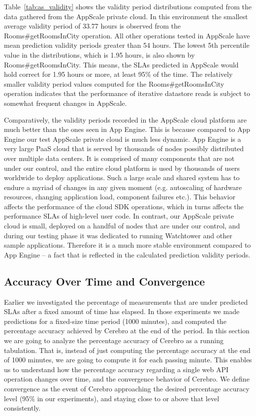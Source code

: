 Table~\ref{tab:as_validity} shows the validity period distributions computed from the data gathered from
the AppScale private cloud. In this environment the smallest average validity period of 33.77 hours is observed from the
Rooms\#getRoomsInCity operation. All other operations tested in AppScale have mean prediction validity periods greater
than 54 hours. The lowest 5th percentile value in the distributions, which is 1.95 hours, is also shown by Rooms\#getRoomsInCity. This means, the SLAs predicted in AppScale would hold correct for 1.95 hours or more, at least 95\% of the time.
The relatively smaller validity period values computed for the
Rooms\#getRoomsInCity operation indicates that the performance of iterative datastore reads is subject to somewhat frequent changes 
in AppScale.

Comparatively, the validity periods recorded in the AppScale
cloud platform are much better than the ones seen in App Engine. This is because compared to App Engine our
test AppScale private cloud is much less dynamic. App Engine is a very large PaaS cloud that is served by thousands of
nodes possibly distributed over multiple data centers. It is comprised of many components that are not under our control,
and the entire cloud platform is used by thousands of users worldwide to deploy applications. Such a large scale and
shared system has to endure a myriad of changes in any given moment (e.g. autoscaling of hardware resources, 
changing application load, component failures etc.). This behavior affects the performance of the cloud SDK operations, which
in turns affects the performance SLAs of high-level user code. In contrast, our AppScale
private cloud is small, deployed on a handful of nodes that are under our control, and during our testing phase it was dedicated
to running Watchtower and other sample applications. Therefore it is a much more stable environment compared to 
App Engine -- a fact that is reflected in the calculated prediction validity periods.

\subsection{Accuracy Over Time and Convergence}
Earlier we investigated the percentage of measurements that are under predicted SLAs 
after a fixed amount of time has elapsed.
In those experiments we made predictions for a fixed-size time period (1000 minutes), 
and computed the percentage accuracy achieved by Cerebro at the end of the period.
In this section we are going to analyze the percentage accuracy of Cerebro as a running 
tabulation. That is, instead of just
computing the percentage accuracy at the end of 1000 minutes, we are going to compute it 
for each passing minute. This enables us to
understand how the percentage accuracy regarding a single web API operation changes over time, 
and the convergence behavior of Cerebro. We define convergence as the event of Cerebro
approaching the desired percentage accuracy level (95\% in
our experiments), and staying close to or above that level consistently.

